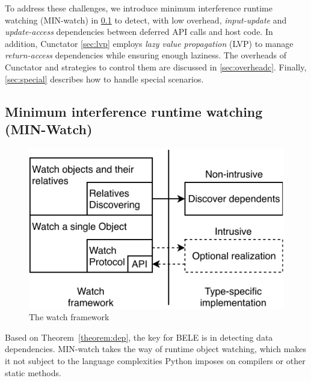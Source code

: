 \documentclass[sigconf]{acmart}\settopmatter{printfolios=true,printccs=false,printacmref=false}\setcopyright{none}
\begin{document}
To address these challenges, we introduce minimum interference runtime watching (MIN-watch) in \cref{sec:watch} to detect, with low overhead, \textit{input-update} and \textit{update-access} dependencies between deferred API calls and host code. In addition, Cunctator \cref{sec:lvp} employs \textit{lazy value propagation} (LVP) to manage \textit{return-access} dependencies while ensuring enough laziness. The overheads of Cunctator and strategies to control them are discussed in \cref{sec:overheadc}. Finally, \cref{sec:special} describes how to handle special scenarios.

\subsection{Minimum interference runtime watching (MIN-Watch)}
\label{sec:watch}

\begin{figure}
    \centering
    \includegraphics[width=0.7\columnwidth]{figure/watch.pdf}
    \caption{The watch framework}
    \label{fig:watch}
\end{figure}

Based on Theorem~\ref{theorem:dep}, the key for BELE is in detecting data dependencies. MIN-watch takes the way of runtime object watching, which makes it not subject to the language complexities Python imposes on compilers or other static methods. 


\end{document}

